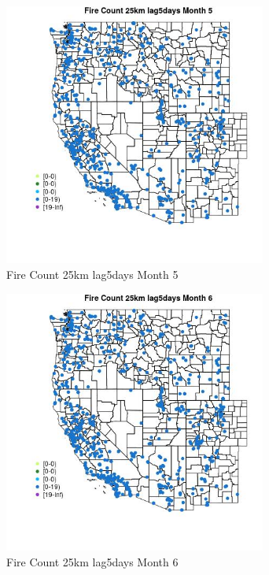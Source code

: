 \begin{figure} 
\centering  
\includegraphics[width=0.77\textwidth]{Code_Outputs/Report_ML_input_PM25_Step4_part_e_de_duplicated_aves_compiled_2019-05-21wNAs_MapObsMo5Fire_Count_25km_lag5days.jpg} 
\caption{\label{fig:Report_ML_input_PM25_Step4_part_e_de_duplicated_aves_compiled_2019-05-21wNAsMapObsMo5Fire_Count_25km_lag5days}Fire Count 25km lag5days Month 5} 
\end{figure} 
 

\begin{figure} 
\centering  
\includegraphics[width=0.77\textwidth]{Code_Outputs/Report_ML_input_PM25_Step4_part_e_de_duplicated_aves_compiled_2019-05-21wNAs_MapObsMo6Fire_Count_25km_lag5days.jpg} 
\caption{\label{fig:Report_ML_input_PM25_Step4_part_e_de_duplicated_aves_compiled_2019-05-21wNAsMapObsMo6Fire_Count_25km_lag5days}Fire Count 25km lag5days Month 6} 
\end{figure} 
 

